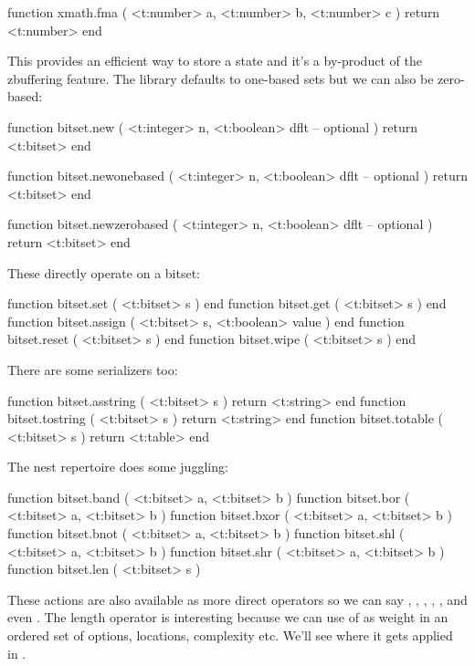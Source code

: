 function xmath.fma (
    <t:number> a,
    <t:number> b,
    <t:number> c
)
    return <t:number>
end
\stoptyping

\stopsubsection

\stopsubsection

\startsubsection[title=Bitset]

This provides an efficient way to store a state and it's a by-product of
the zbuffering feature. The library defaults to one-based sets but we can
also be zero-based:

\starttyping[option=LUA]
function bitset.new (
    <t:integer> n,
    <t:boolean> dflt -- optional
)
    return <t:bitset>
end

function bitset.newonebased  (
    <t:integer> n,
    <t:boolean> dflt -- optional
)
    return <t:bitset>
end

function bitset.newzerobased (
    <t:integer> n,
    <t:boolean> dflt -- optional
)
    return <t:bitset>
end
\stoptyping

These directly operate on a bitset:

\starttyping[option=LUA]
function bitset.set    ( <t:bitset> s ) end
function bitset.get    ( <t:bitset> s ) end
function bitset.assign ( <t:bitset> s, <t:boolean> value ) end
function bitset.reset  ( <t:bitset> s ) end
function bitset.wipe   ( <t:bitset> s ) end
\stoptyping

There are some serializers too:

\starttyping[option=LUA]
function bitset.asstring ( <t:bitset> s ) return <t:string> end
function bitset.tostring ( <t:bitset> s ) return <t:string> end
function bitset.totable  ( <t:bitset> s ) return <t:table>  end
\stoptyping

The nest repertoire does some juggling:

\starttyping[option=LUA]
function bitset.band ( <t:bitset> a, <t:bitset> b )
function bitset.bor  ( <t:bitset> a, <t:bitset> b )
function bitset.bxor ( <t:bitset> a, <t:bitset> b )
function bitset.bnot ( <t:bitset> a, <t:bitset> b )
function bitset.shl  ( <t:bitset> a, <t:bitset> b )
function bitset.shr  ( <t:bitset> a, <t:bitset> b )
function bitset.len  ( <t:bitset> s )
\stoptyping

These actions are also available as more direct operators so we can say , , , , , 
and even . The length operator is interesting because we can use of as
weight in an ordered set of options, locations, complexity etc. We'll see where
it gets applied in \CONTEXT.

